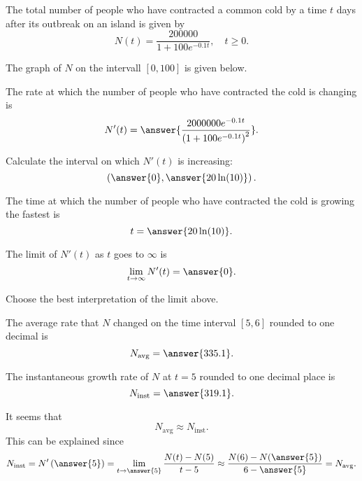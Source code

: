 \documentclass{ximera}
\author{Nela Lakos \and Kyle Parsons \and Bobby Ramsey}
\begin{document}
\begin{exercise}

The total number of people who have contracted a common cold by a time $t$ days after its outbreak on an island is given by
\[
N(t) = \frac{200000}{1+100e^{-0.1t}},\quad t\geq0.
\]

The graph of $N$ on the intervall $[0,100]$ is given below.

\begin{image}
\end{image}

The rate at which the number of people who have contracted the cold is changing is
\[
N'(t) = \answer{\frac{2000000e^{-0.1t}}{\left(1+100e^{-0.1t}\right)^2}}.
\]

Calculate the interval on which $N'(t)$ is increasing:
\[
\left(\answer{0},\answer{20\ln(10)}\right).
\]

The time at which the number of people who have contracted the cold is growing the fastest is
\[
t = \answer{20\ln(10)}.
\]



The limit of $N'(t)$ as $t$ goes to $\infty$ is
\[
\lim_{t\to\infty}N'(t) = \answer{0}.
\]

Choose the best interpretation of the limit above.
\begin{multipleChoice}
\end{multipleChoice}

The average rate that $N$ changed on the time interval $[5,6]$ rounded to one decimal is
\[
N_{\text{avg}} = \answer{335.1}.
\]

The instantaneous growth rate of $N$ at $t=5$ rounded to one decimal place is
\[
N_{\text{inst}} = \answer{319.1}.
\]

It seems that 
\[
N_{\text{avg}}\approx N_{\text{inst}}.
\]
This can be explained since
\[
N_{\text{inst}} = N'\left(\answer{5}\right) = \lim_{t\to\answer{5}}\frac{N(t)-N(5)}{t-5} \approx \frac{N(6) - N(\answer{5})}{6-\answer{5}} = N_{\text{avg}}.
\]

\end{exercise}
\end{document}
